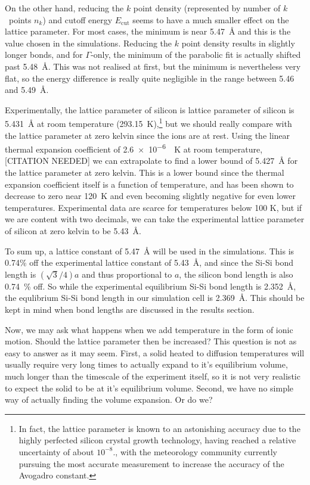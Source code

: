 \documentclass[11pt,bibliography=totoc,index=totoc]{scrbook}   %
\begin{document}
On the other hand, reducing the $k$ point density (represented by number of $k$~points $n_k$) and cutoff energy $E_{\text{cut}}$ seems to have a much smaller effect on the lattice parameter. For most cases, the minimum is near \SI{5.47}{\angstrom} and this is the value chosen in the simulations.
Reducing the $k$ point density results in slightly longer bonds, and for $\Gamma$-only, the minimum of the parabolic fit is actually shifted past 5.48~Å.
This was not realised at first, but the minimum is nevertheless very flat, so the energy difference is really quite negligible in the range between 5.46 and 5.49~Å.

Experimentally, the lattice parameter of silicon is lattice parameter of silicon is \SI{5.431}{\angstrom} at room temperature (\SI{293.15}{\kelvin}),\cite{CODATA:2006}\footnote{In fact, the lattice parameter is known to an astonishing accuracy due to the highly perfected silicon crystal growth technology, having reached a relative uncertainty of about $10^{-8}$.\cite{Becker:2009}, with the meteorology community currently pursuing the most accurate measurement to increase the accuracy of the Avogadro constant.} but we should really compare with the lattice parameter at zero kelvin since the ions are at rest.
Using the linear thermal expansion coefficient of \SI{2.6e-6}{\per\kelvin} at room temperature,[CITATION NEEDED]
we can extrapolate to find a lower bound of \SI{5.427}{\angstrom} for the lattice parameter at zero kelvin. This is a lower bound since the thermal expansion coefficient itself is a function of temperature, and has been shown to decrease to zero near \SI{120}{\kelvin} and even becoming slightly negative for even lower temperatures.\cite{Sugino:1990} Experimental data are scarce for temperatures below 100 K, but if we are content with two decimals, we can take the experimental lattice parameter of silicon at zero kelvin to be \SI{5.43}{\angstrom}.

To sum up, a lattice constant of 5.47~Å  will be used in the simulations. 
This is 0.74\% off the experimental lattice constant of 5.43~Å, and since the Si-Si bond length is $(\sqrt{3}/4)a$ and thus proportional to $a$, 
the silicon bond length is also 0.74~\% off.
So while the experimental equilibrium Si-Si bond length is \SI{2.352}{\angstrom}, the equlibrium Si-Si bond length in our simulation cell is \SI{2.369}{\angstrom}.
This should be kept in mind when bond lengths are discussed in the results section.

Now, we may ask what happens when we add temperature in the form of ionic motion.
Should the lattice parameter then be increased? 
This question is not as easy to answer as it may seem.
First, a solid heated to diffusion temperatures will usually require very long times to actually expand to it's equilibrium volume, much longer than the timescale of the experiment itself, so it is not very realistic to expect the solid to be at it's equilibrium volume.
Second, we have no simple way of actually finding the volume expansion. Or do we?
\end{document}
